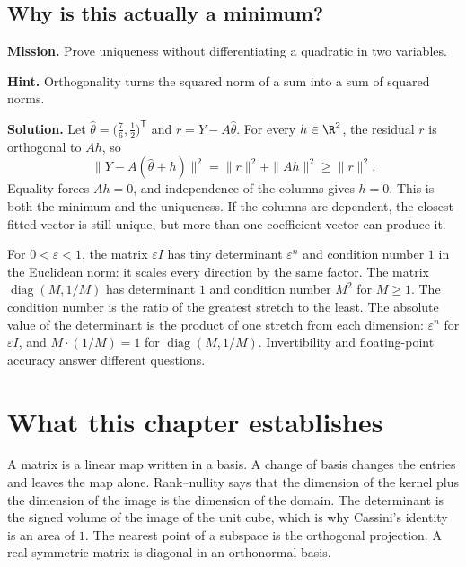\subsection*{Why is this actually a minimum?}
\textbf{Mission.} Prove uniqueness without differentiating a quadratic in two variables.

\textbf{Hint.} Orthogonality turns the squared norm of a sum into a sum of squared norms.

\textbf{Solution.} Let $\widehat\theta=\bigl(\frac76,\frac12\bigr)^{\mathsf T}$ and $r=Y-A\widehat\theta$. For every $h\in\R^2$, the residual $r$ is orthogonal to $Ah$, so
\[
\|Y-A(\widehat\theta+h)\|^2=\|r\|^2+\|Ah\|^2\ge\|r\|^2.
\]
Equality forces $Ah=0$, and independence of the columns gives $h=0$. This is both the minimum and the uniqueness. If the columns are dependent, the closest fitted vector is still unique, but more than one coefficient vector can produce it.

\begin{remark}
For $0<\varepsilon<1$, the matrix $\varepsilon I$ has tiny determinant $\varepsilon^n$ and condition number $1$ in the Euclidean norm: it scales every direction by the same factor. The matrix $\operatorname{diag}(M,1/M)$ has determinant $1$ and condition number $M^2$ for $M\ge1$. The condition number is the ratio of the greatest stretch to the least. The absolute value of the determinant is the product of one stretch from each dimension: $\varepsilon^n$ for $\varepsilon I$, and $M\cdot(1/M)=1$ for $\operatorname{diag}(M,1/M)$. Invertibility and floating-point accuracy answer different questions.
\end{remark}


\section*{What this chapter establishes}

A matrix is a linear map written in a basis. A change of basis changes the entries and leaves the map alone. Rank--nullity says that the dimension of the kernel plus the dimension of the image is the dimension of the domain. The determinant is the signed volume of the image of the unit cube, which is why Cassini's identity is an area of $1$. The nearest point of a subspace is the orthogonal projection. A real symmetric matrix is diagonal in an orthonormal basis.

